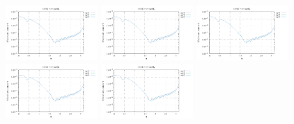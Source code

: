\noindent
\includegraphics[width=3.5cm]{python_codes/fieldstone_152/RESULTS/exp3/sr2_16_m2}
\includegraphics[width=3.5cm]{python_codes/fieldstone_152/RESULTS/exp3/sr2_16_m3}
\includegraphics[width=3.5cm]{python_codes/fieldstone_152/RESULTS/exp3/sr2_16_m4}
\includegraphics[width=3.5cm]{python_codes/fieldstone_152/RESULTS/exp3/sr2_16_m5}
\includegraphics[width=3.5cm]{python_codes/fieldstone_152/RESULTS/exp3/sr2_16_m6}

